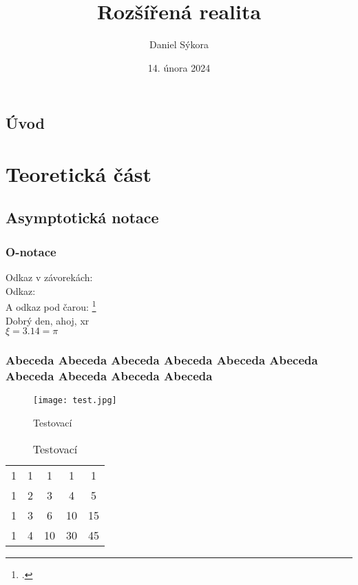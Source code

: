 \documentclass[12pt]{report}
\author{Daniel Sýkora}
\title{Rozšířená realita}
\date{14. února 2024}
\begin{document}
\mytitlepage


\abstrakt{
	\lipsum[1]
}{
	\lipsum[1]
}

\podekovani{
	\lipsum[2]
}

\tableofcontents
\newpage




\chapter*{Úvod}

\lipsum[1]


\part{Teoretická část}

\chapter{Asymptotická notace}

\section{O-notace}
Odkaz v závorekách: \cite[see][page 900]{einstein}\\
Odkaz: \cite{knuthwebsite}\\
A odkaz pod čarou: \footcite[see][s. 42]{latexcompanion}\\
Dobrý den, ahoj, \gls{xr}\\
$\xi = 3.14 = \pi$

\section{Abeceda Abeceda Abeceda Abeceda Abeceda Abeceda Abeceda Abeceda Abeceda Abeceda }
\begin{figure}
	\texttt{[image: test.jpg]}
	\caption{Testovací}
	\label{fig:test}
\end{figure}
\begin{table}
	\caption{Testovací}
	\label{tab:test2}
	\begin{tabular}{ccccc}
		1 & 1 & 1  & 1  & 1  \\
		1 & 2 & 3  & 4  & 5  \\
		1 & 3 & 6  & 10 & 15 \\
		1 & 4 & 10 & 30 & 45
	\end{tabular}
\end{table}
\end{document}
